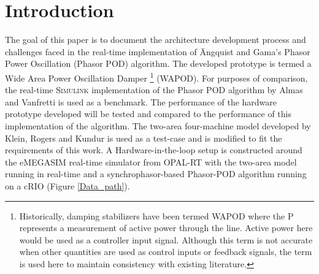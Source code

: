 \documentclass[conference]{IEEEtran}
\begin{document}
\begin{abstract}
\end{abstract}





%
\IEEEpeerreviewmaketitle



\section{Introduction}
The goal of this paper is to document the architecture development process and challenges faced in the real-time implementation of \"{A}ngquist and Gama's\cite{PhasorPOD} Phasor Power Oscillation (Phasor POD) algorithm. The developed prototype is termed a Wide Area Power Oscillation Damper \footnote{Historically, damping stabilizers have been termed WAPOD where the P represents a measurement of active power through the line. Active power here would be used as a controller input signal. Although this term is not accurate when other quantities are used as control inputs or feedback signals, the term is used here to maintain consistency with existing literature.} (WAPOD). For purposes of comparison, the real-time \textsc{Simulink} implementation of the Phasor POD algorithm by Almas and Vanfretti \cite{PhasorPODImplement} is used as a benchmark. The performance of the hardware prototype developed will be tested and compared to the performance of this implementation of the algorithm. The two-area four-machine model developed by Klein, Rogers and Kundur \cite{KundurTwoArea} is used as a test-case and is modified to fit the requirements of this work. A Hardware-in-the-loop setup is constructed around the e\textsc{MEGASIM} real-time simulator from OPAL-RT \cite{OPALemegasim} with the two-area model running in real-time and a synchrophasor-based Phasor-POD algorithm running on a cRIO (Figure \ref{Data_path}).
\end{document}
